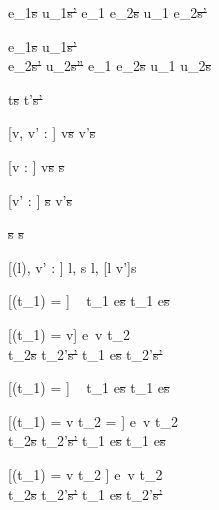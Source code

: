   {e_1\st{s} \normalise u_1\st{s'}}
  {e_1 \Next e_2\st{s} \normalise u_1 \Next e_2\st{s'}}

  {e_1\st{s}  \normalise u_1\st{s'}  \\
   e_2\st{s'} \normalise u_2\st{s''} }
  {e_1 \And e_2\st{s} \normalise u_1 \And u_2\st{s}}






  {t\st{s}  t'\st{s'}}


[v, v' : \beta]
  { }
  {\Edit v\st{s}  \Edit v'\st{s}}


[v : \beta]
  { }
  {\Edit v\st{s} \handle{\Clear} \Fill \beta\st{s}}


[v' : \beta]
  { }
  {\Fill \beta\st{s}  \Edit v'\st{s}}


  { }
  {\Fail\st{s}  \Fail\st{s}}




[\Sigma(l), v' : \tau]
  { }
{\Change l, s  \Change l, [l \mapsto v']s}

[\Value(t_1) = \bot]
  {\ }
  {t_1 \Next e\st{s} \handle{\Next} t_1 \Next e\st{s}}

[\Value(t_1) = v]
  {e\ v \evaluate t_2    \\
   t_2\st{s} \normalise t_2'\st{s'} }
  {t_1 \Next e\st{s} \handle{\Next} t_2'\st{s'}}

[\Value(t_1) = \bot]
  {\ }
  {t_1 \Then e\st{s} \handle{\Execute \pi} t_1 \Then e\st{s}}

[\Value(t_1) = v \land t_2 = \Fail]
  {e\ v \evaluate t_2    \\
   t_2\st{s} \handle{\Pick \pi} t_2'\st{s'} }
  {t_1 \Then e\st{s} \handle{\Execute \pi} t_1 \Then e\st{s}}

[\Value(t_1) = v \land t_2 \neq \Fail]
  {e\ v \evaluate t_2    \\
   t_2\st{s} \handle{\Pick \pi} t_2'\st{s'} }
  {t_1 \Then e\st{s} \handle{\Execute \pi} t_2'\st{s'}}

